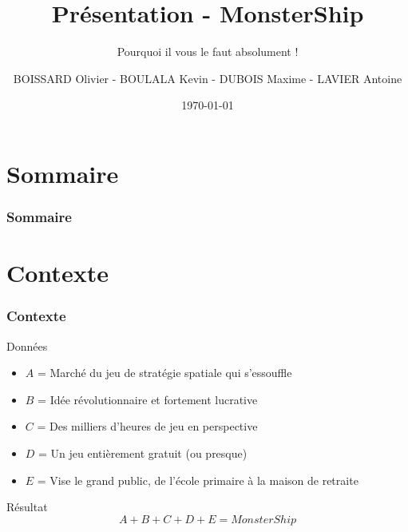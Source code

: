 \documentclass{beamer}
\title[Présentation - MonsterShip]{Présentation - MonsterShip}
\subtitle[\dots]{Pourquoi il vous le faut absolument !}
\author[Olivier - Kevin - Maxime - Antoine]{BOISSARD Olivier - BOULALA Kevin - DUBOIS Maxime - LAVIER Antoine}
\institute[UFR ST]{UFR ST - Besançon\\Projet de PAD}
\date{\today}
\begin{document}
	\frame{\titlepage}
	
	\section*{Sommaire}
		\begin{frame}
			\frametitle{Sommaire}
			\tableofcontents
		\end{frame}
		
	\section{Contexte}
		\begin{frame}
			\frametitle{Contexte}
			\begin{block}{Données}
				\begin{itemize}
					\item $A$ = Marché du jeu de stratégie spatiale qui s'essouffle
					\item $B$ = Idée révolutionnaire et fortement lucrative
					\item $C$ = Des milliers d'heures de jeu en perspective
					\item $D$ = Un jeu entièrement gratuit (ou presque)
					\item $E$ = Vise le grand public, de l'école primaire à la maison de retraite
				\end{itemize}
			\end{block}
			
			\begin{alertblock}{Résultat}
				\[
					A + B + C + D + E = MonsterShip
				\]
			\end{alertblock}
		\end{frame}
		
\end{document}
